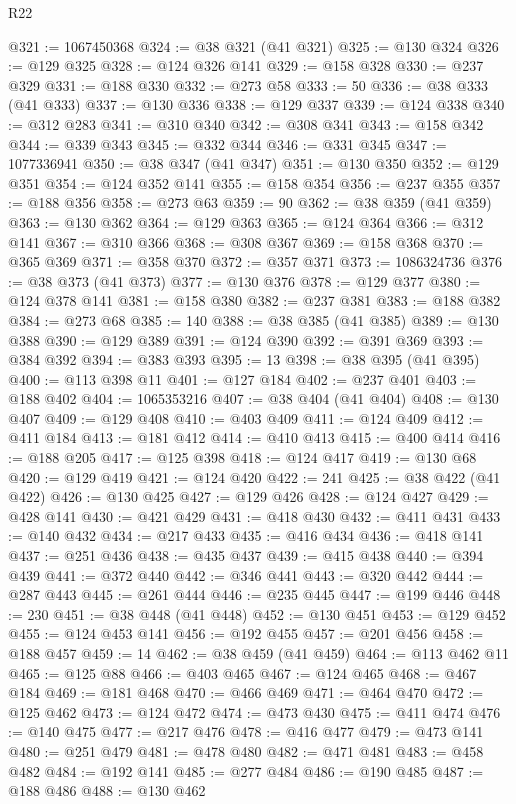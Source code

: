 \begin{lexlean}{R22}
\begin{coremodule}
@321 := 1067450368
@324 := @38 @321 (@41 @321)
@325 := @130 @324
@326 := @129 @325
@328 := @124 @326 @141
@329 := @158 @328
@330 := @237 @329
@331 := @188 @330
@332 := @273 @58
@333 := 50
@336 := @38 @333 (@41 @333)
@337 := @130 @336
@338 := @129 @337
@339 := @124 @338
@340 := @312 @283
@341 := @310 @340
@342 := @308 @341
@343 := @158 @342
@344 := @339 @343
@345 := @332 @344
@346 := @331 @345
@347 := 1077336941
@350 := @38 @347 (@41 @347)
@351 := @130 @350
@352 := @129 @351
@354 := @124 @352 @141
@355 := @158 @354
@356 := @237 @355
@357 := @188 @356
@358 := @273 @63
@359 := 90
@362 := @38 @359 (@41 @359)
@363 := @130 @362
@364 := @129 @363
@365 := @124 @364
@366 := @312 @141
@367 := @310 @366
@368 := @308 @367
@369 := @158 @368
@370 := @365 @369
@371 := @358 @370
@372 := @357 @371
@373 := 1086324736
@376 := @38 @373 (@41 @373)
@377 := @130 @376
@378 := @129 @377
@380 := @124 @378 @141
@381 := @158 @380
@382 := @237 @381
@383 := @188 @382
@384 := @273 @68
@385 := 140
@388 := @38 @385 (@41 @385)
@389 := @130 @388
@390 := @129 @389
@391 := @124 @390
@392 := @391 @369
@393 := @384 @392
@394 := @383 @393
@395 := 13
@398 := @38 @395 (@41 @395)
@400 := @113 @398 @11
@401 := @127 @184
@402 := @237 @401
@403 := @188 @402
@404 := 1065353216
@407 := @38 @404 (@41 @404)
@408 := @130 @407
@409 := @129 @408
@410 := @403 @409
@411 := @124 @409
@412 := @411 @184
@413 := @181 @412
@414 := @410 @413
@415 := @400 @414
@416 := @188 @205
@417 := @125 @398
@418 := @124 @417
@419 := @130 @68
@420 := @129 @419
@421 := @124 @420
@422 := 241
@425 := @38 @422 (@41 @422)
@426 := @130 @425
@427 := @129 @426
@428 := @124 @427
@429 := @428 @141
@430 := @421 @429
@431 := @418 @430
@432 := @411 @431
@433 := @140 @432
@434 := @217 @433
@435 := @416 @434
@436 := @418 @141
@437 := @251 @436
@438 := @435 @437
@439 := @415 @438
@440 := @394 @439
@441 := @372 @440
@442 := @346 @441
@443 := @320 @442
@444 := @287 @443
@445 := @261 @444
@446 := @235 @445
@447 := @199 @446
@448 := 230
@451 := @38 @448 (@41 @448)
@452 := @130 @451
@453 := @129 @452
@455 := @124 @453 @141
@456 := @192 @455
@457 := @201 @456
@458 := @188 @457
@459 := 14
@462 := @38 @459 (@41 @459)
@464 := @113 @462 @11
@465 := @125 @88
@466 := @403 @465
@467 := @124 @465
@468 := @467 @184
@469 := @181 @468
@470 := @466 @469
@471 := @464 @470
@472 := @125 @462
@473 := @124 @472
@474 := @473 @430
@475 := @411 @474
@476 := @140 @475
@477 := @217 @476
@478 := @416 @477
@479 := @473 @141
@480 := @251 @479
@481 := @478 @480
@482 := @471 @481
@483 := @458 @482
@484 := @192 @141
@485 := @277 @484
@486 := @190 @485
@487 := @188 @486
@488 := @130 @462

\end{coremodule}
\end{lexlean}
